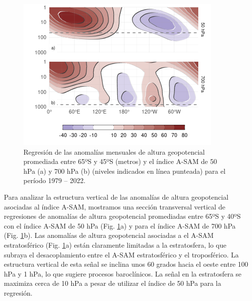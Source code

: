 \documentclass[12pt,oneside]{reedthesis}
\begin{document}
\begin{figure}
\includegraphics{figures/30-sam/vertical-regression-1} \caption{Regresión de las anomalías mensuales de altura geopotencial promediada entre 65ºS y 45ºS (metros) y el índice A-SAM de 50 hPa (a) y 700 hPa (b) (niveles indicados en línea punteada) para el período 1979 -- 2022.}\label{fig:vertical-regression}
\end{figure}

Para analizar la estructura vertical de las anomalías de altura geopotencial asociadas al índice A-SAM, mostramos una sección transversal vertical de regresiones de anomalías de altura geopotencial promediadas entre 65ºS y 40ºS con el índice A-SAM de 50 hPa (Fig. \ref{fig:vertical-regression}a) y para el índice A-SAM de 700 hPa (Fig. \ref{fig:vertical-regression}b).
Las anomalías de altura geopotencial asociadas a el A-SAM estratosférico (Fig. \ref{fig:vertical-regression}a) están claramente limitadas a la estratosfera, lo que subraya el desacoplamiento entre el A-SAM estratosférico y el troposférico.
La estructura vertical de esta señal se inclina unos 60 grados hacia el oeste entre 100 hPa y 1 hPa, lo que sugiere procesos baroclínicos.
La señal en la estratosfera se maximiza cerca de 10 hPa a pesar de utilizar el índice de 50 hPa para la regresión.
\end{document}
